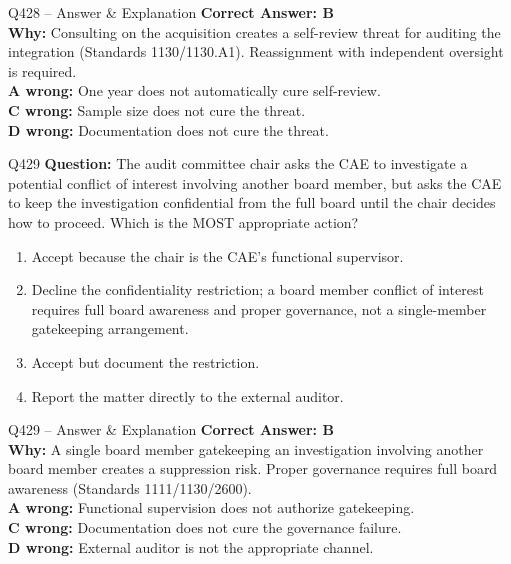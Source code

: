 \documentclass[aspectratio=169,10pt]{beamer}
\begin{document}
	\begin{frame}[t]{Q428 -- Answer \& Explanation}
		\small
		\textbf{Correct Answer: B} \\[4pt]
		\textbf{Why:} Consulting on the acquisition creates a self-review threat for auditing the integration (Standards 1130/1130.A1). Reassignment with independent oversight is required. \\[4pt]
		\textbf{A wrong:} One year does not automatically cure self-review. \\[2pt]
		\textbf{C wrong:} Sample size does not cure the threat. \\[2pt]
		\textbf{D wrong:} Documentation does not cure the threat.
	\end{frame}
	
	\begin{frame}[t]{Q429}
		\small
		\textbf{Question:} The audit committee chair asks the CAE to investigate a potential conflict of interest involving another board member, but asks the CAE to keep the investigation confidential from the full board until the chair decides how to proceed. Which is the MOST appropriate action?
		\begin{enumerate}[label=\Alph*.,itemsep=1pt,topsep=2pt]
			\item Accept because the chair is the CAE's functional supervisor.
			\item Decline the confidentiality restriction; a board member conflict of interest requires full board awareness and proper governance, not a single-member gatekeeping arrangement.
			\item Accept but document the restriction.
			\item Report the matter directly to the external auditor.
		\end{enumerate}
	\end{frame}
	
	\begin{frame}[t]{Q429 -- Answer \& Explanation}
		\small
		\textbf{Correct Answer: B} \\[4pt]
		\textbf{Why:} A single board member gatekeeping an investigation involving another board member creates a suppression risk. Proper governance requires full board awareness (Standards 1111/1130/2600). \\[4pt]
		\textbf{A wrong:} Functional supervision does not authorize gatekeeping. \\[2pt]
		\textbf{C wrong:} Documentation does not cure the governance failure. \\[2pt]
		\textbf{D wrong:} External auditor is not the appropriate channel.
	\end{frame}
	
\end{document}
